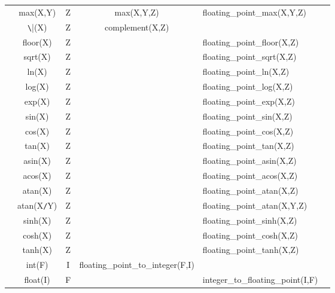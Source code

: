 \begin{table}[t]
\begin{center}
\begin{tabular}{|c|c|c|c|l|l|}
\M{}      & max(X,Y)          & Z & max(X,Y,Z)
                                    & floating_point_max(X,Y,Z)      \\
\M{}      & \verb|\|(X)       & Z & complement(X,Z)                 &\\
\M{}      & floor(X)          & Z & & floating_point_floor(X,Z)      \\
\M{}      & sqrt(X)           & Z & & floating_point_sqrt(X,Z)       \\
\M{}      & ln(X)             & Z & & floating_point_ln(X,Z)         \\
\M{}      & log(X)            & Z & & floating_point_log(X,Z)        \\
\M{}      & exp(X)            & Z & & floating_point_exp(X,Z)        \\
\M{}      & sin(X)            & Z & & floating_point_sin(X,Z)        \\
\M{}      & cos(X)            & Z & & floating_point_cos(X,Z)        \\
\M{}      & tan(X)            & Z & & floating_point_tan(X,Z)        \\
\M{}      & asin(X)           & Z & & floating_point_asin(X,Z)       \\
\M{}      & acos(X)           & Z & & floating_point_acos(X,Z)       \\
\M{}      & atan(X)           & Z & & floating_point_atan(X,Z)       \\
\M{}      & atan(X\verb|/|Y)  & Z & & floating_point_atan(X,Y,Z)     \\
\M{}      & sinh(X)           & Z & & floating_point_sinh(X,Z)       \\
\M{}      & cosh(X)           & Z & & floating_point_cosh(X,Z)       \\
\M{}      & tanh(X)           & Z & & floating_point_tanh(X,Z)       \\
\M{}      & int(F)            & I & floating_point_to_integer(F,I)  &\\
\M{}      & float(I)          & F & & integer_to_floating_point(I,F) \\ \hline
\end{tabular}
				
			
				
			
				

\end{center}
\end{table}
